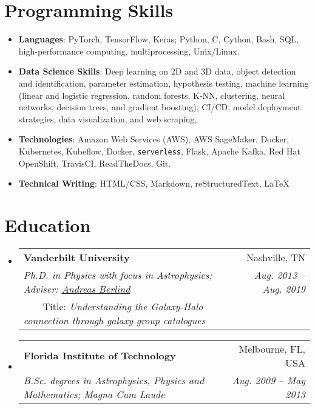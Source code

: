 \documentclass[letterpaper,11pt]{article}
\makeatletter
\newcommand{\resumeSubheading}[4]{
  \vspace{-1pt}\item
    \begin{tabular*}{0.97\textwidth}{l@{\extracolsep{\fill}}r}
      \textbf{#1} & #2 \\
      \textit{\small#3} & \textit{\small #4} \\
    \end{tabular*}\vspace{-5pt}
}
\newcommand{\resumeSubheadingsix}[6]{
  \vspace{-1pt}\item
    \begin{tabular*}{0.97\textwidth}{l@{\extracolsep{\fill}}r}
      \textbf{#1} & #2 \\
      \textit{\small#3} & \textit{\small #4} \\
      \ \ \ \ \small{Title: \textit{#5} #6} \\
    \end{tabular*}\vspace{-5pt}
}
\newcommand{\resumeSubHeadingListStart}{\begin{itemize}[leftmargin=*]}
\newcommand{\resumeSubHeadingListEnd}{\end{itemize}}
\newcommand{\aberlind}{\href{https://as.vanderbilt.edu/physics/bio/andreas-berlind}{Andreas Berlind}}
\makeatother
\begin{document}
\section{Programming Skills}
 \resumeSubHeadingListStart
   \item{
        \textbf{Languages}{: PyTorch, TensorFlow, Keras; Python, C, Cython, Bash, SQL, high-performance computing,
        multiprocessing, Unix/Linux}.}
    \item{
        \textbf{Data Science Skills}: Deep learning on 2D and 3D data, object detection and identification, parameter estimation,
        hypothesis testing, machine learning (linear and logistic regression, random forests,
        K-NN, clustering, neural networks, decision trees, and gradient boosting),
        CI/CD, model deployment strategies, data visualization, and web scraping,
    }
    \item{
     \textbf{Technologies}{: Amazon Web Services (AWS), AWS SageMaker, Docker, Kubernetes, Kubeflow, Docker,
     \texttt{serverless}, Flask, Apache Kafka, Red Hat OpenShift, TravisCI, ReadTheDocs, Git.}
   }
   \item{
     \textbf{Technical Writing}{: HTML/CSS, Markdown, reStructuredText, \LaTeX}
    }
 \resumeSubHeadingListEnd

\section{Education}
  \resumeSubHeadingListStart
    \resumeSubheadingsix
      {Vanderbilt University}{Nashville, TN}
      {Ph.D. in Physics with focus in Astrophysics;
      Adviser: \aberlind}{Aug. 2013 -- Aug. 2019}
      {Understanding the Galaxy-Halo connection through galaxy group catalogues}
      {\href{https://www.overleaf.com/read/ngzgrthrnrcj}{\faLink}}
    \resumeSubheading
      {Florida Institute of Technology}{Melbourne, FL, USA}
      {B.Sc. degrees in Astrophysics, Physics and Mathematics;
      Magna Cum Laude}{Aug. 2009 -- May 2013}
    \resumeSubHeadingListEnd



\end{document}
